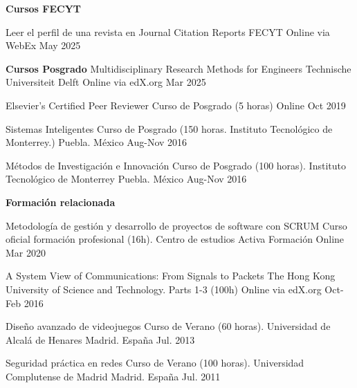 \textbf{Cursos FECYT}
\begin{cvhonors}
   \cvhonor
   {Leer el perfil de una revista en Journal Citation Reports } %
   {FECYT} %
   {Online via WebEx} %
   {May 2025} %
   
\textbf{Cursos Posgrado}
   \cvhonor
	{Multidisciplinary Research Methods for Engineers} %
	{Technische Universiteit Delft} %
	{Online via edX.org} %
	{Mar 2025} %
	
   \cvhonor
	{Elsevier’s Certified Peer Reviewer} %
	{Curso de Posgrado (5 horas)} %
	{Online} %
	{Oct 2019} %

   \cvhonor
	{Sistemas Inteligentes} %
	{Curso de Posgrado (150 horas. Instituto Tecnológico de Monterrey.)} %
	{Puebla. México} %
	{Aug-Nov 2016} %
	
   \cvhonor
	{Métodos de Investigación e Innovación} %
	{Curso de Posgrado (100 horas). Instituto Tecnológico de Monterrey} %
	{Puebla. México} %
	{Aug-Nov 2016} %
\end{cvhonors}
\textbf{Formación relacionada}
\begin{cvhonors}	
	\cvhonor
	{Metodología de gestión y desarrollo de proyectos de software con SCRUM} %
	{Curso oficial formación profesional (16h). Centro de estudios Activa Formación} %
	{Online} %
	{Mar 2020} %

	\cvhonor
	{A System View of Communications: From Signals to Packets} %
	{The Hong Kong University of Science and Technology. Parts 1-3 (100h)}
	{Online via edX.org} %
	{Oct-Feb 2016} %
	
	\cvhonor
	{Diseño avanzado de videojuegos} %
	{Curso de Verano (60 horas). Universidad de Alcalá de Henares}
	{Madrid. España} %
	{Jul. 2013} %
	
	\cvhonor
	{Seguridad práctica en redes} %
	{Curso de Verano (100 horas). Universidad Complutense de Madrid}
	{Madrid. España} %
	{Jul. 2011} %
\end{cvhonors}

